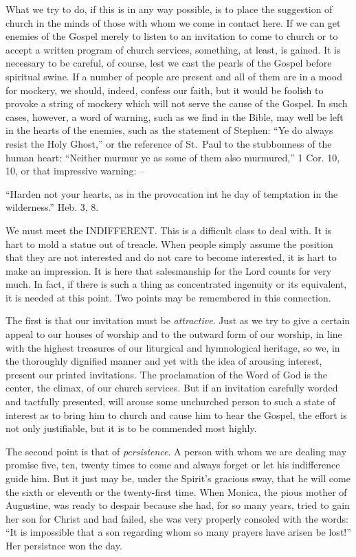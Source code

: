 \documentclass[
]{book}
\begin{document}
What we try to do, if this is in any way possible, is to place the suggestion of church in the minds of those with whom we come in contact here. If we can get enemies of the Gospel merely to listen to an invitation to come to church or to accept a written program of church services, something, at least, is gained. It is necessary to be careful, of course, lest we cast the pearls of the Gospel before spiritual swine. If a number of people are present and all of them are in a mood for mockery, we should, indeed, confess our faith, but it would be foolish to provoke a string of mockery which will not serve the cause of the Gospel. In such cases, however, a word of warning, such as we find in the Bible, may well be left in the hearts of the enemies, such as the statement of Stephen: ``Ye do always resist the Holy Ghost,'' or the reference of St.~Paul to the stubbonness of the human heart: ``Neither murmur ye as some of them also murmured,'' 1 Cor. 10, 10, or that impressive warning: --

``Harden not your hearts, as in the provocation int he day of temptation in the wilderness.'' Heb. 3, 8.

We must meet the INDIFFERENT. This is a difficult class to deal with. It is hart to mold a statue out of treacle. When people simply assume the position that they are not interested and do not care to become interested, it is hart to make an impression. It is here that salesmanship for the Lord counts for very much. In fact, if there is such a thing as concentrated ingenuity or its equivalent, it is needed at this point. Two points may be remembered in this connection.

The first is that our invitation must be \emph{attractive}. Just as we try to give a certain appeal to our houses of worship and to the outward form of our worship, in line with the highest treasures of our liturgical and hymnological heritage, so we, in the thoroughly dignified manner and yet with the idea of arousing interest, present our printed invitations. The proclamation of the Word of God is the center, the climax, of our church services. But if an invitation carefully worded and tactfully presented, will arouse some unchurched person to such a state of interest as to bring him to church and cause him to hear the Gospel, the effort is not only justifiable, but it is to be commended most highly.

The second point is that of \emph{persistence}. A person with whom we are dealing may promise five, ten, twenty times to come and always forget or let his indifference guide him. But it just may be, under the Spirit's gracious sway, that he will come the sixth or eleventh or the twenty-first time. When Monica, the pious mother of Augustine, was ready to despair because she had, for so many years, tried to gain her son for Christ and had failed, she was very properly consoled with the words: ``It is impossible that a son regarding whom so many prayers have arisen be lost!'' Her persistnce won the day.
\end{document}
